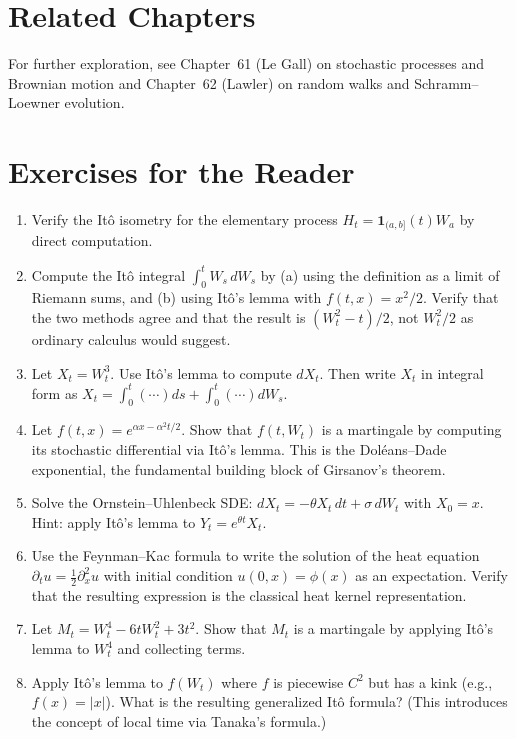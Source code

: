 \section{Related Chapters}
For further exploration, see Chapter~61 (Le Gall) on stochastic processes and Brownian motion and Chapter~62 (Lawler) on random walks and Schramm--Loewner evolution.

\section*{Exercises for the Reader}

\begin{enumerate}
    \item [B] Verify the It\^{o} isometry for the elementary process \(H_t = \mathbf{1}_{(a,b]}(t)W_a\) by direct computation.
    \item [B] Compute the It\^{o} integral \(\int_0^t W_s \, dW_s\) by (a) using the definition as a limit of Riemann sums, and (b) using It\^{o}'s lemma with \(f(t,x) = x^2/2\). Verify that the two methods agree and that the result is \((W_t^2 - t)/2\), not \(W_t^2/2\) as ordinary calculus would suggest.
    \item [B] Let \(X_t = W_t^3\). Use It\^{o}'s lemma to compute \(dX_t\). Then write \(X_t\) in integral form as \(X_t = \int_0^t (\cdots) ds + \int_0^t (\cdots) dW_s\).
    \item [I] Let \(f(t,x) = e^{\alpha x - \alpha^2 t/2}\). Show that \(f(t,W_t)\) is a martingale by computing its stochastic differential via It\^{o}'s lemma. This is the Dol\'eans--Dade exponential, the fundamental building block of Girsanov's theorem.
    \item [B] Solve the Ornstein--Uhlenbeck SDE: \(dX_t = -\theta X_t\,dt + \sigma\,dW_t\) with \(X_0 = x\). Hint: apply It\^{o}'s lemma to \(Y_t = e^{\theta t} X_t\).
    \item [I] Use the Feynman--Kac formula to write the solution of the heat equation \(\partial_t u = \frac12 \partial_x^2 u\) with initial condition \(u(0,x) = \phi(x)\) as an expectation. Verify that the resulting expression is the classical heat kernel representation.
    \item [I] Let \(M_t = W_t^4 - 6tW_t^2 + 3t^2\). Show that \(M_t\) is a martingale by applying It\^{o}'s lemma to \(W_t^4\) and collecting terms.
    \item [I] Apply It\^{o}'s lemma to \(f(W_t)\) where \(f\) is piecewise \(C^2\) but has a kink (e.g., \(f(x) = |x|\)). What is the resulting generalized It\^{o} formula? (This introduces the concept of local time via Tanaka's formula.)

\end{enumerate}
